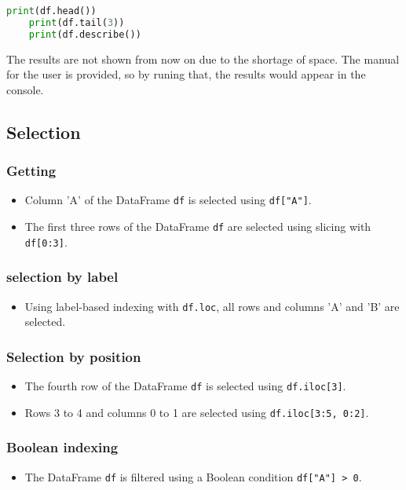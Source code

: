 \begin{lstlisting}[language=Python]
	print(df.head())
	print(df.tail(3))
	print(df.describe())
\end{lstlisting}

The results are not shown from now on due to the shortage of space. The manual for the user is provided, so by runing that, the results would appear in the console.
\subsection{Selection}


\subsubsection{Getting}

\begin{itemize}
	\item Column 'A' of the DataFrame \texttt{df} is selected using \texttt{df["A"]}.
	\item The first three rows of the DataFrame \texttt{df} are selected using slicing with \texttt{df[0:3]}.
\end{itemize}
\subsubsection{selection by label}
\begin{itemize}
	\item Using label-based indexing with \texttt{df.loc}, all rows and columns 'A' and 'B' are selected.
\end{itemize}


\subsubsection{Selection by position}
\begin{itemize}
	\item The fourth row of the DataFrame \texttt{df} is selected using \texttt{df.iloc[3]}.
	\item Rows 3 to 4 and columns 0 to 1 are selected using \texttt{df.iloc[3:5, 0:2]}.
\end{itemize}


\subsubsection{Boolean indexing}
\begin{itemize}
	\item The DataFrame \texttt{df} is filtered using a Boolean condition \texttt{df["A"] > 0}.
\end{itemize}



